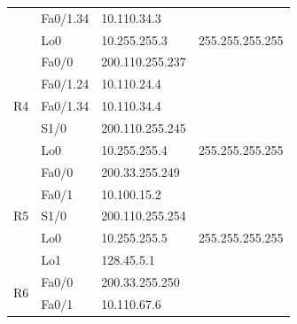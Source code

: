 \documentclass[12pt,twoside,a4paper]{report}
\begin{document}
\begin{table}[!htbp]
\begin{tabular}{|c|l|l|l|}
                     & Fa0/1.34                                & 10.110.34.3                             &                                     \\ \cline{2-4} 
                     & Lo0                                     & 10.255.255.3                            & 255.255.255.255                     \\ \hline
\multirow{5}{*}{R4}  & Fa0/0                                   & 200.110.255.237                         &                                     \\ \cline{2-4} 
                     & Fa0/1.24                                & 10.110.24.4                             &                                     \\ \cline{2-4} 
                     & Fa0/1.34                                & 10.110.34.4                             &                                     \\ \cline{2-4} 
                     & S1/0                                    & 200.110.255.245                         &                                     \\ \cline{2-4} 
                     & Lo0                                     & 10.255.255.4                            & 255.255.255.255                     \\ \hline
\multirow{5}{*}{R5}  & Fa0/0                                   & 200.33.255.249                          &                                     \\ \cline{2-4} 
                     & Fa0/1                                   & 10.100.15.2                             &                                     \\ \cline{2-4} 
                     & S1/0                                    & 200.110.255.254                         &                                     \\ \cline{2-4} 
                     & Lo0                                     & 10.255.255.5                            & 255.255.255.255                     \\ \cline{2-4} 
                     & Lo1                                     & 128.45.5.1                              &                                     \\ \hline
\multirow{5}{*}{R6}  & Fa0/0                                   & 200.33.255.250                          &                                     \\ \cline{2-4} 
                     & Fa0/1                                   & 10.110.67.6                             &                                     \\ \cline{2-4} 

\end{tabular}
\end{table}
\end{document}
